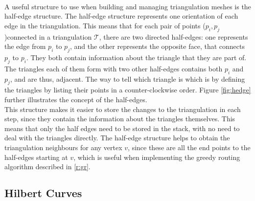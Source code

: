 \paragraph{}
A useful structure to use when building and managing triangulation meshes is the half-edge structure. The half-edge structure represents one orientation of each edge in the triangulation. This means that for each pair of points ($p_i,p_j$)connected in a triangulation $\mathcal{T}$, there are two directed half-edges: one represents the edge from $p_i$ to $p_j$, and the other represents the opposite face, that connects $p_j$ to $p_i$. They both contain information about the triangle that they are part of. The triangles each of them form with two other half-edges contains both $p_i$ and $p_j$, and are thus, adjacent. The way to tell which triangle is which is by defining the triangles by listing their points in a counter-clockwise order. Figure \ref{fig:hedge} further illustrates the concept of the half-edges.\\

This structure makes it easier to store the changes to the triangulation in each step, since they contain the information about the triangles themselves. This means that only the half edges need to be stored in the stack, with no need to deal with the triangles directly.
The half-edge structure helps to obtain the triangulation neighbours for any vertex $v$, since these are all the end points to the half-edges starting at $v$, which is useful when implementing the greedy routing algorithm described in \ref{r:gr}. 
\subsection{Hilbert Curves}
